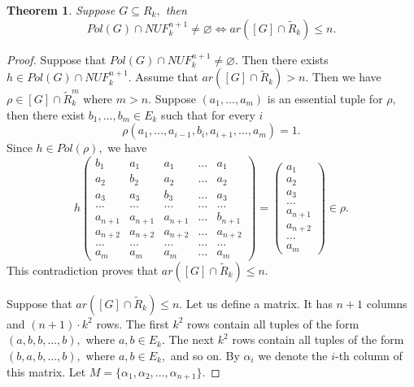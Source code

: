 \documentclass{au}
\theoremstyle{plain}
\newtheorem{theorem}{Theorem}
\theoremstyle{definition}
\theoremstyle{remark}
\numberwithin{equation}{section}
\begin{document}
\setcounter{backupone}{\value{theorem}}
\setcounter{theorem}{\value{nufcounter}}

\begin{theorem}

Suppose $G\subseteq R_{k},$ then
$$Pol(G)\cap NUF_{k}^{n+1}\neq \varnothing \Longleftrightarrow
ar([G] \cap \widetilde R_{k}) \le n .$$

\end{theorem}

\setcounter{theorem}{\value{backupone}}

\begin{proof}

Suppose that $Pol(G)\cap NUF_{k}^{n+1}\neq  \varnothing.$
Then there exists $h\in Pol(G)\cap NUF_{k}^{n+1}.$
Assume that $ar([G] \cap \widetilde R_{k})> n .$
Then we have $\rho \in [G] \cap \widetilde R_{k}^{m}$
where $m>n.$
Suppose $(a_{1},\ldots,a_{m})$ is an essential tuple for $\rho,$
then there exist $b_{1},\ldots,b_{m}\in E_{k}$ such that for every $i$
$$\rho(a_{1},\ldots,a_{i-1},b_{i},a_{i+1},\ldots,a_{m}) = 1.$$
Since $h\in Pol(\rho),$ we have
$$h \begin{pmatrix}
b_{1} & a_{1} & a_{1} &\ldots & a_{1} \\
a_{2} & b_{2} & a_{2} &\ldots & a_{2} \\
a_{3} & a_{3} & b_{3} &\ldots & a_{3} \\
\ldots &\ldots &\ldots &\ldots & \ldots \\
a_{n+1} & a_{n+1} & a_{n+1} &\ldots & b_{n+1} \\
a_{n+2} & a_{n+2} & a_{n+2} &\ldots & a_{n+2} \\
\ldots &\ldots &\ldots &\ldots & \ldots \\
a_{m} & a_{m} & a_{m} &\ldots & a_{m}
 \end{pmatrix}=
 \begin{pmatrix}
a_{1}\\a_{2}\\a_{3}\\ \ldots \\ a_{n+1}\\ a_{n+2} \\ \ldots \\ a_{m}
 \end{pmatrix}
 \in \rho.$$
This contradiction proves that $ar([G] \cap \widetilde R_{k}) \le n.$

Suppose that $ar([G] \cap \widetilde R_{k}) \le n.$
Let us define a matrix.
It has $n+1$ columns and $(n+1)\cdot k^{2}$ rows.
The first $k^{2}$ rows contain all
tuples of the form $(a,b,b,\ldots, b),$
where $a,b\in E_{k}.$
The next $k^{2}$ rows contain all
tuples of the form $(b,a,b,\ldots, b),$
where $a,b\in E_{k},$ and so on.
By $\alpha_{i}$ we denote the $i$-th column of this matrix.
Let $M = \{\alpha_{1},\alpha_{2},\ldots,\alpha_{n+1}\}.$


\end{proof}
\end{document}
